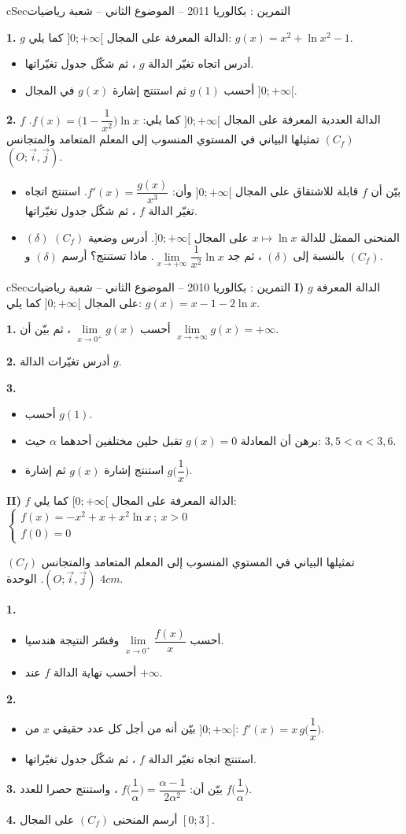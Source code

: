 \documentclass[12pt,a4paper]{article}
\newenvironment{BOX}[2]{\begin{otherlanguage}{english}\begin{arbox}{#1}{#2}}{\end{arbox}\end{otherlanguage}}
\newcounter{exo}
\newenvironment{tamrin}[1]{\stepcounter{exo}\begin{BOX}{cSec}{التمرين \theexo: #1}}{\end{BOX}}
\newenvironment{sq}{\begin{itemize}[leftmargin=2.4em,itemsep=3pt]}{\end{itemize}}
\newcommand{\qa}{\item[(أ)]}\newcommand{\qb}{\item[(ب)]}\newcommand{\qc}{\item[(جـ)]}\newcommand{\qd}{\item[(د)]}\newcommand{\qe}{\item[(هـ)]}
\newcommand{\QQ}[1]{\par\smallskip\textbf{#1.} }
\begin{document}
\begin{tamrin}{بكالوريا 2011 -- الموضوع الثاني -- شعبة رياضيات}
\QQ{1} $g$ الدالة المعرفة على المجال $]0;+\infty[$ كما يلي: $g(x)=x^2+\ln x^2-1$.
\begin{sq}
\qa أدرس اتجاه تغيّر الدالة $g$ ، ثم شكّل جدول تغيّراتها.
\qb أحسب $g(1)$ ثم استنتج إشارة $g(x)$ في المجال $]0;+\infty[$.
\end{sq}
\QQ{2} $f$ الدالة العددية المعرفة على المجال $]0;+\infty[$ كما يلي: $f(x)=\Big(1-\dfrac1{x^2}\Big)\ln x$.
$(C_f)$ تمثيلها البياني في المستوي المنسوب إلى المعلم المتعامد والمتجانس $(O;\vec i,\vec j)$.
\begin{sq}
\qa بيّن أن $f$ قابلة للاشتقاق على المجال $]0;+\infty[$ وأن: $f'(x)=\dfrac{g(x)}{x^3}$. استنتج اتجاه تغيّر الدالة $f$ ، ثم شكّل جدول تغيّراتها.
\qb $(\delta)$ المنحنى الممثل للدالة $x\mapsto\ln x$ على المجال $]0;+\infty[$.
أدرس وضعية $(C_f)$ بالنسبة إلى $(\delta)$ ، ثم جد $\lim\limits_{x\to+\infty}\dfrac{1}{x^2}\ln x$. ماذا تستنتج؟
أرسم $(\delta)$ و $(C_f)$.
\end{sq}
\end{tamrin}

\begin{tamrin}{بكالوريا 2010 -- الموضوع الثاني -- شعبة رياضيات}
\textbf{I)} $g$ الدالة المعرفة على المجال $]0;+\infty[$ كما يلي: $g(x)=x-1-2\ln x$.
\QQ{1} أحسب $\lim\limits_{x\to0^{+}}g(x)$ ، ثم بيّن أن $\lim\limits_{x\to+\infty}g(x)=+\infty$.
\QQ{2} أدرس تغيّرات الدالة $g$.
\QQ{3}
\begin{sq}
\qa أحسب $g(1)$.
\qb برهن أن المعادلة $g(x)=0$ تقبل حلين مختلفين أحدهما $\alpha$ حيث: $3{,}5<\alpha<3{,}6$.
\qc استنتج إشارة $g(x)$ ثم إشارة $g\Big(\dfrac1x\Big)$.
\end{sq}

\textbf{II)} $f$ الدالة المعرفة على المجال $[0;+\infty[$ كما يلي:
$\begin{cases} f(x)=-x^2+x+x^2\ln x\ ;\ x>0\\ f(0)=0\end{cases}$

$(C_f)$ تمثيلها البياني في المستوي المنسوب إلى المعلم المتعامد والمتجانس $(O;\vec i,\vec j)$. الوحدة $4cm$.
\QQ{1}
\begin{sq}
\qa أحسب $\lim\limits_{x\to0^{+}}\dfrac{f(x)}{x}$ وفسّر النتيجة هندسيا.
\qb أحسب نهاية الدالة $f$ عند $+\infty$.
\end{sq}
\QQ{2}
\begin{sq}
\qa بيّن أنه من أجل كل عدد حقيقي $x$ من $]0;+\infty[$: $f'(x)=x\,g\Big(\dfrac1x\Big)$.
\qb استنتج اتجاه تغيّر الدالة $f$ ، ثم شكّل جدول تغيّراتها.
\end{sq}
\QQ{3} بيّن أن: $f\Big(\dfrac1\alpha\Big)=\dfrac{\alpha-1}{2\alpha^2}$ ، واستنتج حصرا للعدد $f\Big(\dfrac1\alpha\Big)$.
\QQ{4} أرسم المنحنى $(C_f)$ على المجال $[0;3]$.
\end{tamrin}
\end{document}
